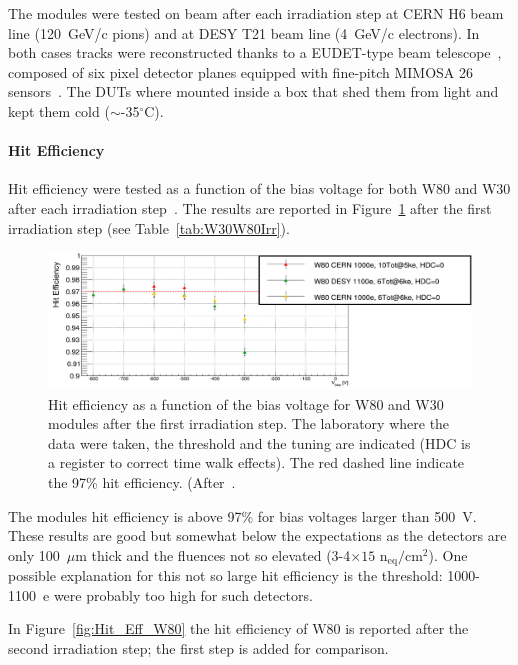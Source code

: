 The modules were tested on beam after each irradiation step at CERN H6 beam line (120~GeV/c pions) and at DESY T21 beam line (4~GeV/c electrons).
 In both cases tracks were reconstructed thanks to  a EUDET-type beam telescope~\cite{Jansen2016}, 
 composed of six pixel detector planes equipped with fine-pitch MIMOSA 26 sensors~\cite{mimosa26}. 
 The DUTs where mounted inside a box that shed them from light and kept them cold 
 ($\sim$-35$^{\circ}$C).
 


\paragraph{Hit Efficiency}
Hit efficiency were tested as a function of the bias voltage for both W80 and W30 after each irradiation 
step~\cite{TrentoWS2017}. 
The results are reported in Figure~\ref{fig:HitEffW80W30} after the first irradiation step
(see Table~\ref{tab:W30W80Irr}).

\begin{figure}[!htpb]
\centering
\includegraphics[width=1.0\textwidth]{ZoomHitEffLowFl.pdf}
\caption{\label{fig:HitEffW80W30}Hit efficiency as a function of the bias voltage for W80 and W30 modules 
after the first irradiation step. The laboratory where the data were taken, the threshold and the tuning 
are indicated (HDC is a register to correct time walk effects). The red dashed line indicate the 97\% 
hit efficiency. (After~\cite{TrentoWS2017}.}
\end{figure}

The modules hit efficiency is above 97\% for bias voltages larger than 500~V. These results are good 
but somewhat below the expectations as the detectors are only 100~$\mu$m thick and the fluences 
not so elevated (3-4$\times{15}$ n$_\text{eq}/\text{cm}^2$). One possible explanation for this not 
so large hit efficiency is the threshold: 1000-1100~e were probably too high for such detectors. 

In Figure~\ref{fig:Hit_Eff_W80} the hit efficiency of W80 is reported after the second irradiation step; 
the first step is added for comparison.

